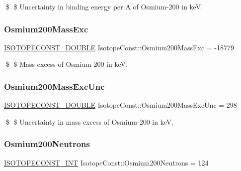 \$ \$ Uncertainty in binding energy per A of Osmium-\/200 in keV. \mbox{\label{group___isotope_const-_osmium-_os200_ga2448a9a6d133a0617db975e3f9a20642}} 
\subsubsection{\texorpdfstring{Osmium200\+Mass\+Exc}{Osmium200MassExc}}
{\footnotesize\ttfamily \mbox{\hyperlink{group___isotope_const-_macros_ga8f45a7272ce02c0b4c65c44636ed719a}{I\+S\+O\+T\+O\+P\+E\+C\+O\+N\+S\+T\+\_\+\+D\+O\+U\+B\+LE}} Isotope\+Const\+::\+Osmium200\+Mass\+Exc = -\/18779}

\$ \$ Mass excess of Osmium-\/200 in keV. \mbox{\label{group___isotope_const-_osmium-_os200_ga1b733bedee4ef5edfb8dc3ca0e1aee6f}} 
\subsubsection{\texorpdfstring{Osmium200\+Mass\+Exc\+Unc}{Osmium200MassExcUnc}}
{\footnotesize\ttfamily \mbox{\hyperlink{group___isotope_const-_macros_ga8f45a7272ce02c0b4c65c44636ed719a}{I\+S\+O\+T\+O\+P\+E\+C\+O\+N\+S\+T\+\_\+\+D\+O\+U\+B\+LE}} Isotope\+Const\+::\+Osmium200\+Mass\+Exc\+Unc = 298}

\$ \$ Uncertainty in mass excess of Osmium-\/200 in keV. \mbox{\label{group___isotope_const-_osmium-_os200_gac423d0957405f39f480ca69e1b0288e0}} 
\subsubsection{\texorpdfstring{Osmium200\+Neutrons}{Osmium200Neutrons}}
{\footnotesize\ttfamily \mbox{\hyperlink{group___isotope_const-_macros_ga5f18360b3e99483a35c32d789e62621c}{I\+S\+O\+T\+O\+P\+E\+C\+O\+N\+S\+T\+\_\+\+I\+NT}} Isotope\+Const\+::\+Osmium200\+Neutrons = 124}

